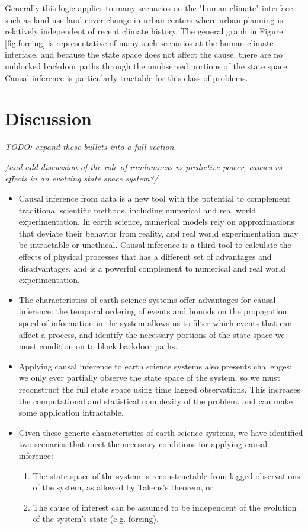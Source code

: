 \documentclass[12pt]{article}
\begin{document}
Generally this logic applies to many scenarios on the "human-climate"
interface, such as land-use land-cover change in urban centers where
urban planning is relatively independent of recent climate
history. The general graph in Figure \ref{fig:forcing} is
representative of many such scenarios at the human-climate interface,
and because the state space does not affect the cause, there are no
unblocked backdoor paths through the unobserved portions of the state
space. Causal inference is particularly tractable for this class of
problems.

\section{Discussion}

\emph{TODO: expand these bullets into a full section}.

\emph{/and add discussion of the role of randomness vs predictive
  power, causes vs effects in an evolving state space system?/}

\begin{itemize}
\item Causal inference from data is a new tool with the potential to
  complement traditional scientific methods, including numerical and
  real world experimentation. In earth science, numerical models rely
  on approximations that deviate their behavior from reality, and real
  world experimentation may be intractable or unethical. Causal
  inference is a third tool to calculate the effects of physical
  processes that has a different set of advantages and
  disadvantages, and is a powerful complement to numerical and real
  world experimentation.
\item The characteristics of earth science systems offer advantages
  for causal inference: the temporal ordering of events and bounds on
  the propagation speed of information in the system allows us to
  filter which events that can affect a process, and identify the
  necessary portions of the state space we must condition on to block
  backdoor paths.
\item Applying causal inference to earth science systems also presents
  challenges: we only ever partially observe the state space of the
  system, so we must reconstruct the full state space using time
  lagged observations. This increases the computational and
  statistical complexity of the problem, and can make some application
  intractable.
\item Given these generic characteristics of earth science systems, we
  have identified two scenarios that meet the necessary conditions for
  applying causal inference:
  \begin{enumerate}
  \item The state space of the system is reconstructable
    from lagged observations of the system, as allowed by
    Takens's theorem, or
  \item The cause of interest can be assumed to be
    independent of the evolution of the system's state
    (e.g. forcing).
  \end{enumerate}
\end{itemize}





\end{document}
